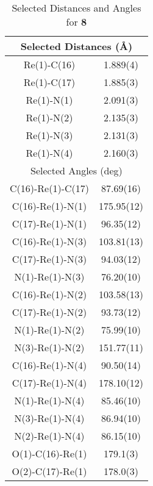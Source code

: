 \begin{table}[htbp]
  \centering
  \caption{Selected Distances and Angles for \textbf{8}}
    \begin{tabular}{cc}
    \toprule
    \multicolumn{2}{c}{Selected Distances (\r{A})} \\
    \midrule
    Re(1)-C(16) & 1.889(4) \\
    Re(1)-C(17) & 1.885(3) \\
    Re(1)-N(1) & 2.091(3) \\
    Re(1)-N(2) & 2.135(3) \\
    Re(1)-N(3) & 2.131(3) \\
    Re(1)-N(4) & 2.160(3) \\ \midrule
    \multicolumn{2}{c}{Selected Angles (deg)} \\ \midrule
    C(16)-Re(1)-C(17) & 87.69(16) \\
    C(16)-Re(1)-N(1) & 175.95(12) \\
    C(17)-Re(1)-N(1) & 96.35(12) \\
    C(16)-Re(1)-N(3) & 103.81(13) \\
    C(17)-Re(1)-N(3) & 94.03(12) \\
    N(1)-Re(1)-N(3) & 76.20(10) \\
    C(16)-Re(1)-N(2) & 103.58(13) \\
    C(17)-Re(1)-N(2) & 93.73(12) \\
    N(1)-Re(1)-N(2) & 75.99(10) \\
    N(3)-Re(1)-N(2) & 151.77(11) \\
    C(16)-Re(1)-N(4) & 90.50(14) \\
    C(17)-Re(1)-N(4) & 178.10(12) \\
    N(1)-Re(1)-N(4) & 85.46(10) \\
    N(3)-Re(1)-N(4) & 86.94(10) \\
    N(2)-Re(1)-N(4) & 86.15(10) \\
    O(1)-C(16)-Re(1) & 179.1(3) \\
    O(2)-C(17)-Re(1) & 178.0(3) \\
    \bottomrule
    \end{tabular}%
  \label{tab.da8}%
\end{table}%

